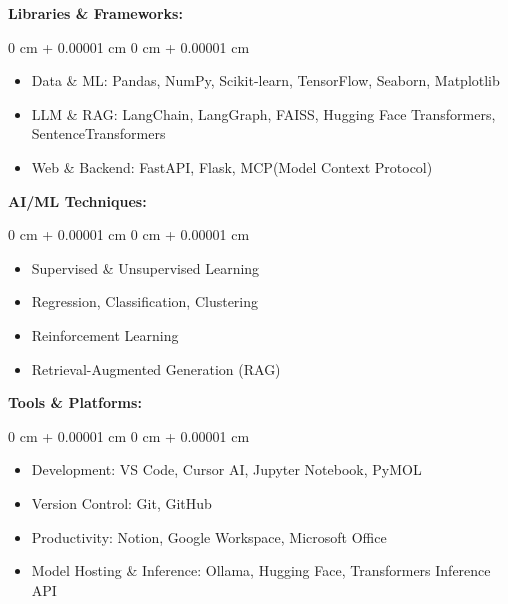 \documentclass[10pt, letterpaper]{article}
\newenvironment{highlights}{
    \begin{itemize}[
        topsep=0.10 cm,
        parsep=0.10 cm,
        partopsep=0pt,
        itemsep=0pt,
        leftmargin=0 cm + 10pt
    ]
}{
    \end{itemize}
} %
\newenvironment{onecolentry}{
    \begin{adjustwidth}{
        0 cm + 0.00001 cm
    }{
        0 cm + 0.00001 cm
    }
}{
    \end{adjustwidth}
} %
\begin{document}
        \textbf{Libraries \& Frameworks:}
        \vspace{0.10 cm}
        \begin{onecolentry}
            \begin{highlights}
                \item Data \& ML: Pandas, NumPy, Scikit-learn, TensorFlow, Seaborn, Matplotlib
                \item LLM \& RAG: LangChain, LangGraph, FAISS, Hugging Face Transformers, SentenceTransformers
                \item Web \& Backend: FastAPI, Flask, MCP(Model Context Protocol)
            \end{highlights}
            \end{onecolentry}

        \vspace{0.2 cm}

        \textbf{AI/ML Techniques:}
        \vspace{0.10 cm}
        \begin{onecolentry}
            \begin{highlights}
                \item Supervised \& Unsupervised Learning
                \item Regression, Classification, Clustering
                \item Reinforcement Learning
                \item Retrieval-Augmented Generation (RAG)
            \end{highlights}
        \end{onecolentry}
        
        \vspace{0.2 cm}

        \textbf{Tools \& Platforms:}
        \vspace{0.10 cm}
        \begin{onecolentry}
            \begin{highlights}
                \item Development: VS Code, Cursor AI, Jupyter Notebook, PyMOL
                \item Version Control: Git, GitHub
                \item Productivity: Notion, Google Workspace, Microsoft Office
                \item Model Hosting \& Inference: Ollama, Hugging Face, Transformers Inference API
                \end{highlights}
        \end{onecolentry}
\end{document}
